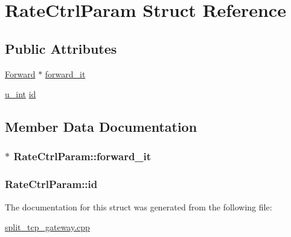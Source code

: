 \hypertarget{structRateCtrlParam}{\section{\-Rate\-Ctrl\-Param \-Struct \-Reference}
\label{structRateCtrlParam}
}
\subsection*{\-Public \-Attributes}
\begin{DoxyCompactItemize}
\item 
\hyperlink{structForward}{\-Forward} $\ast$ \hyperlink{structRateCtrlParam_a9d09e579b32de49598e4cec729d54ae3}{forward\-\_\-it}
\item 
\hyperlink{split__tcp__gateway_8h_ac319c165d52643e43249fe003e18bdf3}{u\-\_\-int} \hyperlink{structRateCtrlParam_a46af77a6562406340d197a9c54c5de7a}{id}
\end{DoxyCompactItemize}


\subsection{\-Member \-Data \-Documentation}
\hypertarget{structRateCtrlParam_a9d09e579b32de49598e4cec729d54ae3}{
\subsubsection[{forward\-\_\-it}]{$\ast$ {\bf \-Rate\-Ctrl\-Param\-::forward\-\_\-it}}}\label{structRateCtrlParam_a9d09e579b32de49598e4cec729d54ae3}
\hypertarget{structRateCtrlParam_a46af77a6562406340d197a9c54c5de7a}{
\subsubsection[{id}]{ {\bf \-Rate\-Ctrl\-Param\-::id}}}\label{structRateCtrlParam_a46af77a6562406340d197a9c54c5de7a}


\-The documentation for this struct was generated from the following file\-:\begin{DoxyCompactItemize}
\item 
\hyperlink{split__tcp__gateway_8cpp}{split\-\_\-tcp\-\_\-gateway.\-cpp}\end{DoxyCompactItemize}
